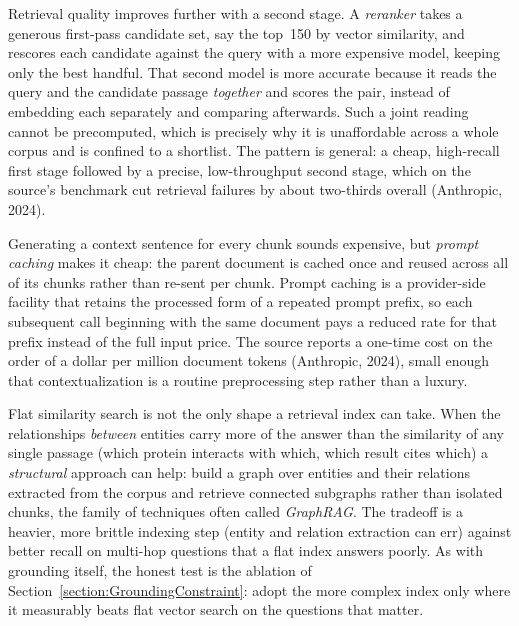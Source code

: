 \begin{remark}
Retrieval quality improves further with a second stage.
A \emph{reranker} takes a generous first-pass candidate set, say the top~150 by vector similarity, and rescores each candidate against the query with a more expensive model, keeping only the best handful.
That second model is more accurate because it reads the query and the candidate passage \emph{together} and scores the pair, instead of embedding each separately and comparing afterwards.
Such a joint reading cannot be precomputed, which is precisely why it is unaffordable across a whole corpus and is confined to a shortlist.
The pattern is general: a cheap, high-recall first stage followed by a precise, low-throughput second stage, which on the source's benchmark cut retrieval failures by about two-thirds overall (Anthropic, 2024).
\end{remark}

\begin{remark}
Generating a context sentence for every chunk sounds expensive, but \emph{prompt caching} makes it cheap: the parent document is cached once and reused across all of its chunks rather than re-sent per chunk.
Prompt caching is a provider-side facility that retains the processed form of a repeated prompt prefix, so each subsequent call beginning with the same document pays a reduced rate for that prefix instead of the full input price.
The source reports a one-time cost on the order of a dollar per million document tokens (Anthropic, 2024), small enough that contextualization is a routine preprocessing step rather than a luxury.
\end{remark}

\begin{remark}
Flat similarity search is not the only shape a retrieval index can take.
When the relationships \emph{between} entities carry more of the answer than the similarity of any single passage (which protein interacts with which, which result cites which) a \emph{structural} approach can help: build a graph over entities and their relations extracted from the corpus and retrieve connected subgraphs rather than isolated chunks, the family of techniques often called \emph{GraphRAG}.
The tradeoff is a heavier, more brittle indexing step (entity and relation extraction can err) against better recall on multi-hop questions that a flat index answers poorly.
As with grounding itself, the honest test is the ablation of Section~\ref{section:GroundingConstraint}: adopt the more complex index only where it measurably beats flat vector search on the questions that matter.
\end{remark}


